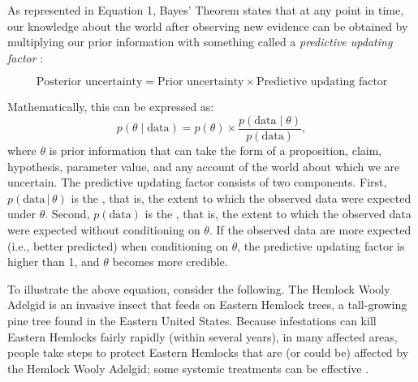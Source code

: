 \documentclass[man, floatsintext]{apa7} %
\newcommand{\given}{\, | \,}
\begin{document}
As represented in Equation 1, Bayes' Theorem states that at any point in time, our knowledge about the world after observing new evidence can be obtained by multiplying our prior information with something called a \emph{predictive updating factor} \parencite{RouderMorey2019,WagenmakersEtAl2016CD}:

\begin{equation*}
        \text{Posterior uncertainty} = \text{Prior uncertainty} \times \text{Predictive updating factor}
\end{equation*}

Mathematically, this can be expressed as:  
\begin{equation}
\label{eq:BayesRule}
        p(\theta \mid \text{data}) = p(\theta) \times \frac{p(\text{data} \mid \theta)}{p(\text{data})},
\end{equation}
where $\theta$ is prior information that can take the form of a  proposition, claim, hypothesis, parameter value, and any account of the world about which we are uncertain. The predictive updating factor consists of two components. First, $p(\text{data} \given \theta)$ is the , that is, the extent to which the observed data were expected under $\theta$. Second, $p(\text{data})$ is the , that is, the extent to which the observed data were expected without conditioning on $\theta$. If the observed data are more expected (i.e., better predicted) when conditioning on $\theta$, the predictive updating factor is higher than 1, and $\theta$ becomes more credible. 

To illustrate the above equation, consider the following. The Hemlock Wooly Adelgid is an invasive insect that feeds on Eastern Hemlock trees, a tall-growing pine tree found in the Eastern United States. Because infestations can kill Eastern Hemlocks fairly rapidly (within several years), in many affected areas, people take steps to protect Eastern Hemlocks that are (or could be) affected by the Hemlock Wooly Adelgid; some systemic treatments can be effective \parencite{nps2021}. \\
\end{document}
